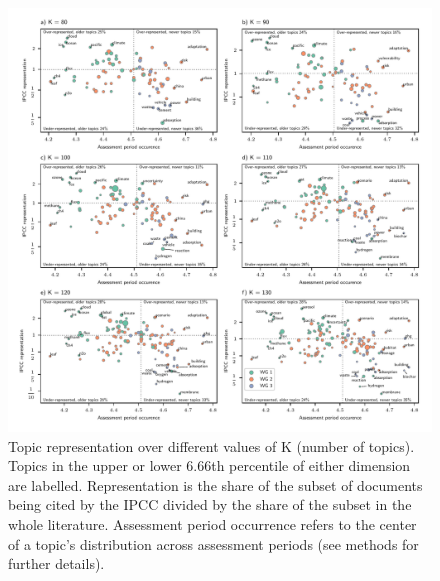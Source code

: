 \documentclass{article}
\begin{document}
\begin{figure}
	\begin{center}
		\includegraphics[width=1\linewidth]{../plots_pub/topic_rep_ks.pdf}
		\caption{Topic representation over different values of K (number of topics). Topics in the upper or lower 6.66th percentile of either dimension are labelled. Representation is the share of the subset of documents being cited by the IPCC divided by the share of the subset in the whole literature. Assessment period occurrence refers to the center of a topic's distribution across assessment periods (see methods for further details).}
		\label{top-rep-ks}
	\end{center}
\end{figure}
\end{document}

